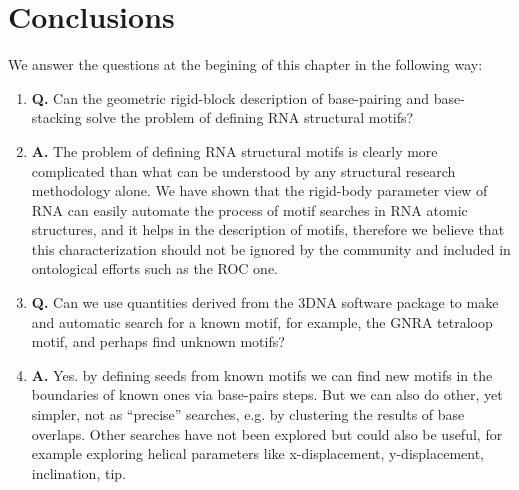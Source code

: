 
\section{Conclusions}
We  answer  the questions  at  the begining  of  this  chapter in  the
following way:

\begin{enumerate}
\item{\textbf{Q.}  Can   the  geometric  rigid-block   description  of
  base-pairing  and base-stacking  solve the  problem of  defining RNA
  structural motifs?}
\item{\textbf{A.}  The problem  of defining  RNA structural  motifs is
  clearly  more  complicated  than  what  can  be  understood  by  any
  structural  research  methodology  alone.  We have  shown  that  the
  rigid-body parameter view of RNA  can easily automate the process of
  motif  searches  in RNA  atomic  structures,  and  it helps  in  the
  description   of   motifs,    therefore   we   believe   that   this
  characterization should not be ignored by the community and included
  in ontological efforts such as the ROC one.}
\item{\textbf{Q.} Can we use quantities derived from the 3DNA software
  package to make and automatic search for a known motif, for example,
  the GNRA tetraloop motif, and perhaps find unknown motifs?}
\item{\textbf{A.} Yes. by defining seeds from known motifs we can find
new motifs in  the boundaries of known ones  via base-pairs steps. But
we  can also  do  other,  yet simpler,  not  as ``precise''  searches,
e.g. by clustering  the results of base overlaps.  Other searches have
not  been explored  but could  also be  useful, for  example exploring
helical  parameters like x-displacement,  y-displacement, inclination,
tip.} 
\end{enumerate}



